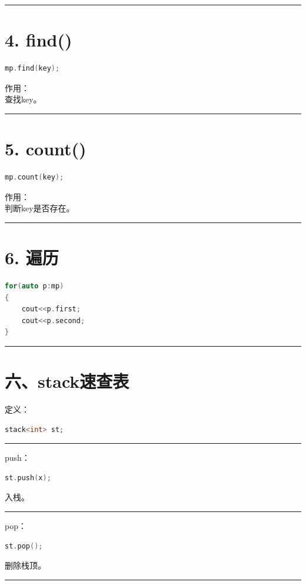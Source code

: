 \documentclass[9pt,twocolumn]{extarticle}
\begin{document}
\noindent\rule{\linewidth}{0.4pt}

\section{4. find()}
\begin{lstlisting}[language=C++]
mp.find(key);
\end{lstlisting}
作用：\\
查找key。

\noindent\rule{\linewidth}{0.4pt}

\section{5. count()}
\begin{lstlisting}[language=C++]
mp.count(key);
\end{lstlisting}
作用：\\
判断key是否存在。

\noindent\rule{\linewidth}{0.4pt}

\section{6. 遍历}
\begin{lstlisting}[language=C++]
for(auto p:mp)
{
    cout<<p.first;
    cout<<p.second;
}
\end{lstlisting}

\noindent\rule{\linewidth}{0.4pt}

\section{六、stack速查表}

定义：
\begin{lstlisting}[language=C++]
stack<int> st;
\end{lstlisting}

\noindent\rule{\linewidth}{0.4pt}

push：
\begin{lstlisting}[language=C++]
st.push(x);
\end{lstlisting}
入栈。

\noindent\rule{\linewidth}{0.4pt}

pop：
\begin{lstlisting}[language=C++]
st.pop();
\end{lstlisting}
删除栈顶。

\noindent\rule{\linewidth}{0.4pt}
\end{document}
